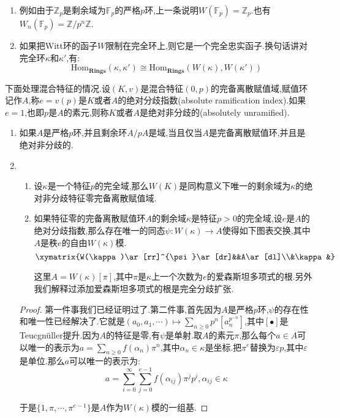 \begin{enumerate}
\begin{proof}
    	唯一性我们解释过了.对于存在性,每个特征$p$的完全域都可以表示为环$\mathbb{F}_p[X_i^{p^{-\infty}}]$的商环.所以按照上述引理,问题归结为证明$\kappa=\mathbb{F}_p[X_i^{p^{-\infty}}]$的情况下的存在性.但是此时有$\widehat{\mathbb{Z}[X_i^{p^{-\infty}}]}$是剩余环是$\kappa$的严格$p$环.
    \end{proof}
    \item 例如由于$\mathbb{Z}_p$是剩余域为$\mathbb{F}_p$的严格$p$环,上一条说明$W(\mathbb{F}_p)=\mathbb{Z}_p$.也有$W_n(\mathbb{F}_p)=\mathbb{Z}/p^n\mathbb{Z}$.
    \item 如果把Witt环的函子$W$限制在完全环上,则它是一个完全忠实函子.换句话讲对完全环$\kappa$和$\kappa'$,有:
    $$\mathrm{Hom}_{\textbf{Rings}}(\kappa,\kappa')\cong\mathrm{Hom}_{\textbf{Rings}}(W(\kappa),W(\kappa'))$$
\end{enumerate}

下面处理混合特征的情况.设$(K,v)$是混合特征$(0,p)$的完备离散赋值域,赋值环记作$A$,称$e=v(p)$是$K$或者$A$的绝对分歧指数(absolute ramification index).如果$e=1$,也即$p$是$A$的素元,则称$K$或者$A$是绝对非分歧的(absolutely unramified).
\begin{enumerate}
	\item 如果$A$是严格$p$环,并且剩余环$A/pA$是域,当且仅当$A$是完备离散赋值环,并且是绝对非分歧的.
	\item 
	\begin{enumerate}
		\item 设$\kappa$是一个特征$p$的完全域,那么$W(K)$是同构意义下唯一的剩余域为$\kappa$的绝对非分歧特征零完备离散赋值域.
		\item 如果特征零的完备离散赋值环$A$的剩余域$\kappa$是特征$p>0$的完全域,设$e$是$A$的绝对分歧指数,那么存在唯一的同态$\psi:W(\kappa)\to A$使得如下图表交换,其中$A$是秩$e$的自由$W(\kappa)$模.
		$$\xymatrix{W(\kappa)\ar[rr]^{\psi}\ar[dr]&&A\ar[dl]\\&\kappa&}$$
		
		这里$A=W(\kappa)[\pi]$,其中$\pi$是$\kappa$上一个次数为$e$的爱森斯坦多项式的根.另外我们解释过添加爱森斯坦多项式的根是完全分歧扩张.
	\end{enumerate}
    \begin{proof}
    	
    	第一件事我们已经证明过了.第二件事,首先因为$A$是严格$p$环,$\psi$的存在性和唯一性已经解决了.它就是$(a_0,a_1,\cdots)\mapsto\sum_{n\ge0}p^n[a_n^{p^{-n}}]$,其中$[\bullet]$是Teucgn\"uller提升.因为$A$的特征是零,有$\psi$是单射.取$A$的素元$\pi$,那么每个$a\in A$可以唯一的表示为$a=\sum_{n\ge0}f(\alpha_n)\pi^n$,其中$\alpha_n\in\kappa$是坐标.把$\pi^e$替换为$\varepsilon p$,其中$\varepsilon$是单位.那么$a$可以唯一的表示为:
    	$$a=\sum_{i=0}^{\infty}\sum_{j=0}^{e-1}f(\alpha_{ij})\pi^jp^i,\alpha_{ij}\in\kappa$$
    	
    	于是$\{1,\pi,\cdots,\pi^{e-1}\}$是$A$作为$W(\kappa)$模的一组基.
    \end{proof}
\end{enumerate}

